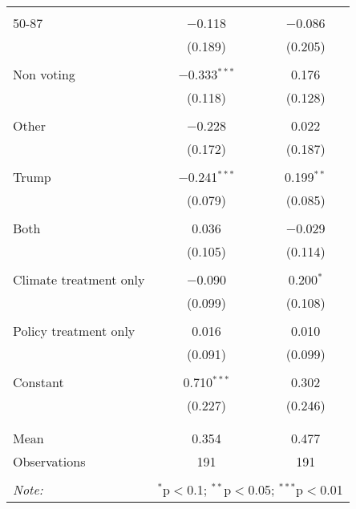 \begin{tabular}{@{\extracolsep{5pt}}lcc}
  & & \\ 
 50-87 & $-$0.118 & $-$0.086 \\ 
  & (0.189) & (0.205) \\ 
  & & \\ 
 Non voting & $-$0.333$^{***}$ & 0.176 \\ 
  & (0.118) & (0.128) \\ 
  & & \\ 
 Other & $-$0.228 & 0.022 \\ 
  & (0.172) & (0.187) \\ 
  & & \\ 
 Trump & $-$0.241$^{***}$ & 0.199$^{**}$ \\ 
  & (0.079) & (0.085) \\ 
  & & \\ 
 Both & 0.036 & $-$0.029 \\ 
  & (0.105) & (0.114) \\ 
  & & \\ 
 Climate treatment only & $-$0.090 & 0.200$^{*}$ \\ 
  & (0.099) & (0.108) \\ 
  & & \\ 
 Policy treatment only & 0.016 & 0.010 \\ 
  & (0.091) & (0.099) \\ 
  & & \\ 
 Constant & 0.710$^{***}$ & 0.302 \\ 
  & (0.227) & (0.246) \\ 
  & & \\ 
\hline \\[-1.8ex] 
Mean & 0.354 & 0.477 \\ 
Observations & 191 & 191 \\ 
\hline 
\hline \\[-1.8ex] 
\textit{Note:}  & \multicolumn{2}{r}{$^{*}$p$<$0.1; $^{**}$p$<$0.05; $^{***}$p$<$0.01} \\ 
\end{tabular} 
